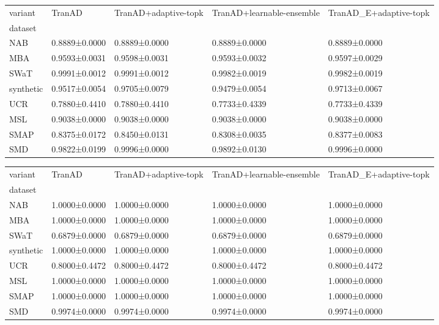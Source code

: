 \begin{tabular}{lllll}
\toprule
variant & TranAD & TranAD+adaptive-topk & TranAD+learnable-ensemble & TranAD_E+adaptive-topk \\
dataset &  &  &  &  \\
\midrule
NAB & 0.8889±0.0000 & 0.8889±0.0000 & 0.8889±0.0000 & 0.8889±0.0000 \\
MBA & 0.9593±0.0031 & 0.9598±0.0031 & 0.9593±0.0032 & 0.9597±0.0029 \\
SWaT & 0.9991±0.0012 & 0.9991±0.0012 & 0.9982±0.0019 & 0.9982±0.0019 \\
synthetic & 0.9517±0.0054 & 0.9705±0.0079 & 0.9479±0.0054 & 0.9713±0.0067 \\
UCR & 0.7880±0.4410 & 0.7880±0.4410 & 0.7733±0.4339 & 0.7733±0.4339 \\
MSL & 0.9038±0.0000 & 0.9038±0.0000 & 0.9038±0.0000 & 0.9038±0.0000 \\
SMAP & 0.8375±0.0172 & 0.8450±0.0131 & 0.8308±0.0035 & 0.8377±0.0083 \\
SMD & 0.9822±0.0199 & 0.9996±0.0000 & 0.9892±0.0130 & 0.9996±0.0000 \\
\bottomrule
\end{tabular}

\begin{tabular}{lllll}
\toprule
variant & TranAD & TranAD+adaptive-topk & TranAD+learnable-ensemble & TranAD_E+adaptive-topk \\
dataset &  &  &  &  \\
\midrule
NAB & 1.0000±0.0000 & 1.0000±0.0000 & 1.0000±0.0000 & 1.0000±0.0000 \\
MBA & 1.0000±0.0000 & 1.0000±0.0000 & 1.0000±0.0000 & 1.0000±0.0000 \\
SWaT & 0.6879±0.0000 & 0.6879±0.0000 & 0.6879±0.0000 & 0.6879±0.0000 \\
synthetic & 1.0000±0.0000 & 1.0000±0.0000 & 1.0000±0.0000 & 1.0000±0.0000 \\
UCR & 0.8000±0.4472 & 0.8000±0.4472 & 0.8000±0.4472 & 0.8000±0.4472 \\
MSL & 1.0000±0.0000 & 1.0000±0.0000 & 1.0000±0.0000 & 1.0000±0.0000 \\
SMAP & 1.0000±0.0000 & 1.0000±0.0000 & 1.0000±0.0000 & 1.0000±0.0000 \\
SMD & 0.9974±0.0000 & 0.9974±0.0000 & 0.9974±0.0000 & 0.9974±0.0000 \\
\bottomrule
\end{tabular}

